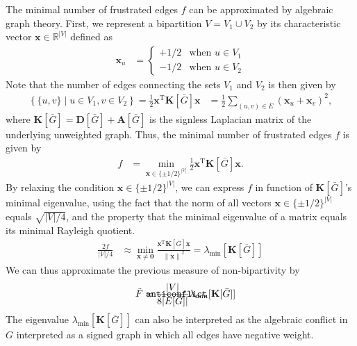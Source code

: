 \documentclass{article}
\def\mathnote#1{%
  \tag*{\rlap{\hspace\marginparsep\smash{\parbox[t]{\marginparwidth}{#1}}}}
}
\begin{document}
The minimal number of frustrated edges $f$ can be approximated by
algebraic graph theory.  First, we represent a bipartition $V = V_1 \cup
V_2$ by its characteristic vector $\mathbf x \in \mathbb R^{|V|}$
defined as
\begin{align*}
  \mathbf x_u &= \left\{ \begin{array}{ll} +1/2 & \text{when $u \in
      V_1$} \\ -1/2 & \text{when $u \in V_2$}
    \end{array} \right. 
\end{align*}
Note that the number of edges connecting the sets $V_1$ and $V_2$ is
then given by
\begin{align*}
\left\{ \{u,v\} \mid u \in V_1, v \in V_2 \right\} = \frac 12 \mathbf
x^{\mathrm T} \mathbf K[\bar G] \mathbf x &= \frac 12 \sum_{(u,v) \in E}
(\mathbf x_u + \mathbf x_v)^2,
\end{align*}
where $\mathbf K[\bar G] = \mathbf D[\bar G] + \mathbf A[\bar G]$ is the
signless Laplacian matrix of the underlying unweighted graph.  Thus, the
minimal number of frustrated edges $f$ is given by
\begin{align*}
  f &= \min_{\mathbf x \in \{\pm 1/2\}^{|V|}} \frac 12 \mathbf
  x^{\mathrm T} \mathbf K[\bar G] \mathbf x.
\end{align*}
By relaxing the condition $\mathbf x \in \{\pm 1/2\}^{|V|}$, we can
express $f$ in function of $\mathbf K[\bar G]$'s minimal eigenvalue,
using the fact that the norm of all vectors $\mathbf x \in \{\pm
1/2\}^{|V|}$ equals $\sqrt{|V|/4}$, and the property that the minimal
eigenvalue of a matrix equals its minimal Rayleigh quotient.
\begin{align*}
  \frac {2f} {|V|/4} &\approx \min_{\mathbf x \neq \mathbf 0} \frac
        {\mathbf x^{\mathrm T} \mathbf K[\bar G] \mathbf x} {\left\|
          \mathbf x \right\|^2} = \lambda_{\min}[\mathbf K[\bar G]]
\end{align*}
We can thus approximate the previous measure of non-bipartivity by
\begin{align}
  \mathnote{\texttt{anticonflict}} \tilde F &= \frac {|V|} {8 |E[\bar
      G]|} \lambda_{\min}[\mathbf K[\bar G]]
\end{align}
The eigenvalue $\lambda_{\min}[\mathbf K[\bar G]]$ can also be
interpreted as the algebraic conflict in $G$ interpreted as a signed
graph in which all edges have negative weight.
\end{document}
